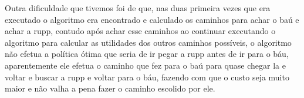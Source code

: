 \documentclass[letterpaper]{article}
\begin{document}
Outra dificuldade que tivemos foi de que, nas duas primeira vezes que era executado o algoritmo era encontrado e calculado os caminhos para achar
o baú e achar a rupp, contudo após achar esse caminhos ao continuar executando o algoritmo para calcular as utilidades dos outros caminhos possíveis,
o algoritmo não efetua a política ótima que seria de ir pegar a rupp antes de ir para o báu, aparentemente ele efetua o caminho que fez para o baú para
quase chegar la e voltar e buscar a rupp e voltar para o báu, fazendo com que o custo seja muito maior e não valha a pena fazer o caminho escolido por
ele. 
\end{document}
